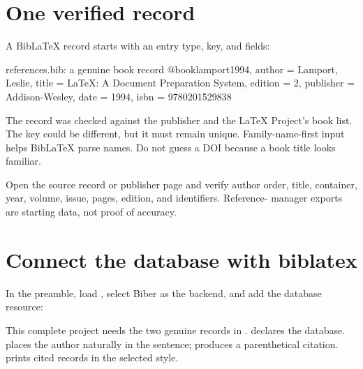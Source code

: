 \section{One verified record}

A Bib\LaTeX{} record starts with an entry type, key, and fields:

\begin{latexcode}{references.bib: a genuine book record}
@book{lamport1994,
  author    = {Lamport, Leslie},
  title     = {\LaTeX{}: A Document Preparation System},
  edition   = {2},
  publisher = {Addison-Wesley},
  date      = {1994},
  isbn      = {9780201529838}
}
\end{latexcode}

The record was checked against the publisher and the \LaTeX{} Project's book
list. The key could be different, but it must remain unique. Family-name-first
input helps Bib\LaTeX{} parse names. Do not guess a DOI because a book title looks
familiar.

\begin{goodpractice}
Open the source record or publisher page and verify author order, title,
container, year, volume, issue, pages, edition, and identifiers. Reference-
manager exports are starting data, not proof of accuracy.
\end{goodpractice}

\section{Connect the database with biblatex}

In the preamble, load , select Biber as the backend, and add the
database resource:


This complete project needs the two genuine records in
.  declares the database.
 places the author naturally in the sentence;
 produces a parenthetical citation. 
prints cited records in the selected style.

